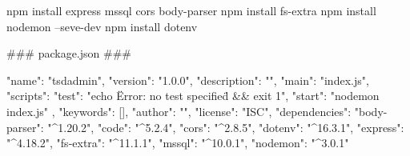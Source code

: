 

npm install express mssql cors body-parser
npm install fs-extra
npm install nodemon --seve-dev
npm install dotenv


### package.json ###

{
  "name": "tsdadmin",
  "version": "1.0.0",
  "description": "",
  "main": "index.js",
  "scripts": {
    "test": "echo \"Error: no test specified\" && exit 1",
    "start": "nodemon index.js"
  },
  "keywords": [],
  "author": "",
  "license": "ISC",
  "dependencies": {
    "body-parser": "^1.20.2",
    "code": "^5.2.4",
    "cors": "^2.8.5",
    "dotenv": "^16.3.1",
    "express": "^4.18.2",
    "fs-extra": "^11.1.1",
    "mssql": "^10.0.1",
    "nodemon": "^3.0.1"
  }
}
